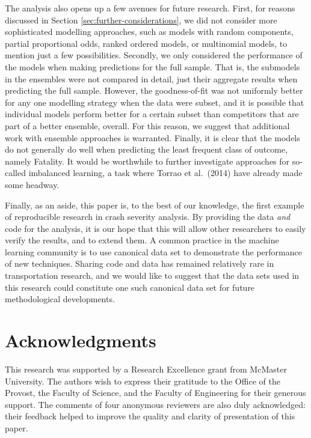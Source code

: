 \documentclass[]{elsarticle} %
\begin{document}
The analysis also opens up a few avenues for future research. First, for
reasons discussed in Section \ref{sec:further-considerations}, we did
not consider more sophisticated modelling approaches, such as models
with random components, partial proportional odds, ranked ordered
models, or multinomial models, to mention just a few possibilities.
Secondly, we only considered the performance of the models when making
predictions for the full sample. That is, the submodels in the ensembles
were not compared in detail, just their aggregate results when
predicting the full sample. However, the goodness-of-fit was not
uniformly better for any one modelling strategy when the data were
subset, and it is possible that individual models perform better for a
certain subset than competitors that are part of a better ensemble,
overall. For this reason, we suggest that additional work with ensemble
approaches is warranted. Finally, it is clear that the models do not
generally do well when predicting the least frequent class of outcome,
namely Fatality. It would be worthwhile to further investigate
approaches for so-called imbalanced learning, a task where Torrao et
al.~(2014) have already made some headway.

Finally, as an aside, this paper is, to the best of our knowledge, the
first example of reproducible research in crash severity analysis. By
providing the data \emph{and} code for the analysis, it is our hope that
this will allow other researchers to easily verify the results, and to
extend them. A common practice in the machine learning community is to
use canonical data set to demonstrate the performance of new techniques.
Sharing code and data has remained relatively rare in transportation
research, and we would like to suggest that the data sets used in this
research could constitute one such canonical data set for future
methodological developments.

\hypertarget{acknowledgments}{%
\section*{Acknowledgments}\label{acknowledgments}}

This research was supported by a Research Excellence grant from McMaster
University. The authors wish to express their gratitude to the Office of
the Provost, the Faculty of Science, and the Faculty of Engineering for
their generous support. The comments of four anonymous reviewers are
also duly acknowledged: their feedback helped to improve the quality and
clarity of presentation of this paper.
\end{document}
